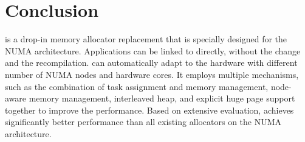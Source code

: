 \section*{Conclusion}
\label{sec:conclusion}

\NM{} is a drop-in memory allocator replacement that is specially designed for the NUMA architecture. Applications can be linked to \NM{} directly, without the change and the recompilation. \NM{} can  automatically adapt to the hardware with different number of NUMA nodes and hardware cores. It employs multiple mechanisms, such as the combination of task assignment and memory management, node-aware memory management, interleaved heap, and explicit huge page support together to improve the performance. Based on extensive evaluation, \NM{} achieves significantly better performance than all existing allocators on the NUMA architecture.  